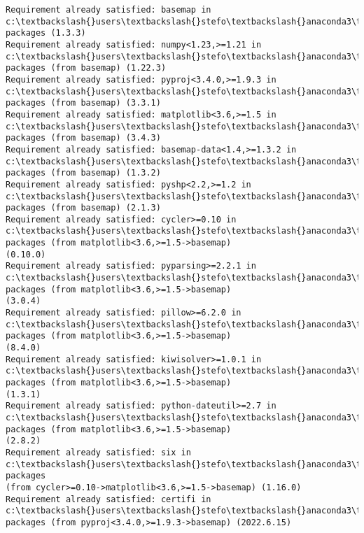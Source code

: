 \documentclass[11pt]{article}
\begin{document}
    \begin{Verbatim}[commandchars=\\\{\}]
Requirement already satisfied: basemap in c:\textbackslash{}users\textbackslash{}stefo\textbackslash{}anaconda3\textbackslash{}lib\textbackslash{}site-
packages (1.3.3)
Requirement already satisfied: numpy<1.23,>=1.21 in
c:\textbackslash{}users\textbackslash{}stefo\textbackslash{}anaconda3\textbackslash{}lib\textbackslash{}site-packages (from basemap) (1.22.3)
Requirement already satisfied: pyproj<3.4.0,>=1.9.3 in
c:\textbackslash{}users\textbackslash{}stefo\textbackslash{}anaconda3\textbackslash{}lib\textbackslash{}site-packages (from basemap) (3.3.1)
Requirement already satisfied: matplotlib<3.6,>=1.5 in
c:\textbackslash{}users\textbackslash{}stefo\textbackslash{}anaconda3\textbackslash{}lib\textbackslash{}site-packages (from basemap) (3.4.3)
Requirement already satisfied: basemap-data<1.4,>=1.3.2 in
c:\textbackslash{}users\textbackslash{}stefo\textbackslash{}anaconda3\textbackslash{}lib\textbackslash{}site-packages (from basemap) (1.3.2)
Requirement already satisfied: pyshp<2.2,>=1.2 in
c:\textbackslash{}users\textbackslash{}stefo\textbackslash{}anaconda3\textbackslash{}lib\textbackslash{}site-packages (from basemap) (2.1.3)
Requirement already satisfied: cycler>=0.10 in
c:\textbackslash{}users\textbackslash{}stefo\textbackslash{}anaconda3\textbackslash{}lib\textbackslash{}site-packages (from matplotlib<3.6,>=1.5->basemap)
(0.10.0)
Requirement already satisfied: pyparsing>=2.2.1 in
c:\textbackslash{}users\textbackslash{}stefo\textbackslash{}anaconda3\textbackslash{}lib\textbackslash{}site-packages (from matplotlib<3.6,>=1.5->basemap)
(3.0.4)
Requirement already satisfied: pillow>=6.2.0 in
c:\textbackslash{}users\textbackslash{}stefo\textbackslash{}anaconda3\textbackslash{}lib\textbackslash{}site-packages (from matplotlib<3.6,>=1.5->basemap)
(8.4.0)
Requirement already satisfied: kiwisolver>=1.0.1 in
c:\textbackslash{}users\textbackslash{}stefo\textbackslash{}anaconda3\textbackslash{}lib\textbackslash{}site-packages (from matplotlib<3.6,>=1.5->basemap)
(1.3.1)
Requirement already satisfied: python-dateutil>=2.7 in
c:\textbackslash{}users\textbackslash{}stefo\textbackslash{}anaconda3\textbackslash{}lib\textbackslash{}site-packages (from matplotlib<3.6,>=1.5->basemap)
(2.8.2)
Requirement already satisfied: six in c:\textbackslash{}users\textbackslash{}stefo\textbackslash{}anaconda3\textbackslash{}lib\textbackslash{}site-packages
(from cycler>=0.10->matplotlib<3.6,>=1.5->basemap) (1.16.0)
Requirement already satisfied: certifi in c:\textbackslash{}users\textbackslash{}stefo\textbackslash{}anaconda3\textbackslash{}lib\textbackslash{}site-
packages (from pyproj<3.4.0,>=1.9.3->basemap) (2022.6.15)
    \end{Verbatim}
\end{document}
